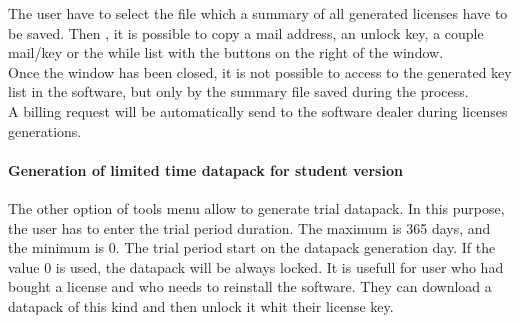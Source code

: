 The user have to select the file which a summary of all generated licenses have to be saved. Then , it is possible to copy a mail address, an unlock key, a couple mail/key or the while list with the buttons on the right of the window.\\

Once the window has been closed, it is not possible to access to the generated key list in the software, but only by the summary file saved during the process.\\


A billing request will be automatically send to the software dealer during licenses generations.\\


\paragraph{Generation of limited time datapack for student version}%

The other option of tools menu allow to generate trial datapack. In this purpose, the user has to enter the trial period duration. The maximum is 365 days, and the minimum is 0. The trial period start on the datapack generation day. If the value 0 is used, the datapack will be always locked. It is usefull for user who had bought a license and who needs to reinstall the software. They can download a datapack of this kind and then unlock it whit their license key.\\


